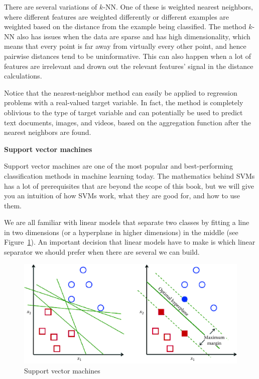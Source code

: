 \documentclass[]{krantz}
\begin{document}
There are several variations of \(k\)-NN. One of these is weighted
nearest neighbors, where different features are weighted differently or
different examples are weighted based on the distance from the example
being classified. The method \(k\)-NN also has issues when the data are
sparse and has high dimensionality, which means that every point is far
away from virtually every other point, and hence pairwise distances tend
to be uninformative. This can also happen when a lot of features are
irrelevant and drown out the relevant features' signal in the distance
calculations.

Notice that the nearest-neighbor method can easily be applied to
regression problems with a real-valued target variable. In fact, the
method is completely oblivious to the type of target variable and can
potentially be used to predict text documents, images, and videos, based
on the aggregation function after the nearest neighbors are found.

\vspace*{-4pt} \textbf{Support vector machines}

Support vector machines are one of the most popular and best-performing
classification methods in machine learning today. The mathematics behind
SVMs has a lot of prerequisites that are beyond the scope of this book,
but we will give you an intuition of how SVMs work, what they are good
for, and how to use them.

We are all familiar with linear models that separate two classes by
fitting a line in two dimensions (or a hyperplane in higher dimensions)
in the middle (see Figure~\ref{fig:svm}). An important decision that
linear models have to make is which linear separator we should prefer
when there are several we can build.

\begin{figure}

{\centering \includegraphics[width=1\linewidth]{ChapterML/figures/svm} 

}

\caption{Support vector machines}\label{fig:svm}
\end{figure}
\end{document}
